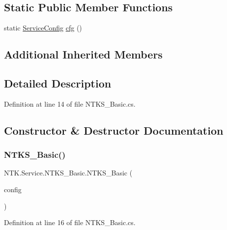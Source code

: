 \subsection*{Static Public Member Functions}
\begin{DoxyCompactItemize}
\item 
static \mbox{\hyperlink{struct_n_t_k_1_1_service_1_1_service_config}{Service\+Config}} \mbox{\hyperlink{class_n_t_k_1_1_service_1_1_n_t_k_s___basic_a80bdfb9e67c9ac5c33fbdb8b10953681}{cfg}} ()
\end{DoxyCompactItemize}
\subsection*{Additional Inherited Members}


\subsection{Detailed Description}




Definition at line 14 of file N\+T\+K\+S\+\_\+\+Basic.\+cs.



\subsection{Constructor \& Destructor Documentation}
\mbox{\label{class_n_t_k_1_1_service_1_1_n_t_k_s___basic_a2fb30ddefef16ad8d121033ced7f0030}} 
\subsubsection{\texorpdfstring{NTKS\_Basic()}{NTKS\_Basic()}}
{\footnotesize\ttfamily N\+T\+K.\+Service.\+N\+T\+K\+S\+\_\+\+Basic.\+N\+T\+K\+S\+\_\+\+Basic (\begin{DoxyParamCaption}\item[{\mbox{\hyperlink{struct_n_t_k_1_1_service_1_1_service_config}{Service\+Config}}}]{config }\end{DoxyParamCaption})}



Definition at line 16 of file N\+T\+K\+S\+\_\+\+Basic.\+cs.




